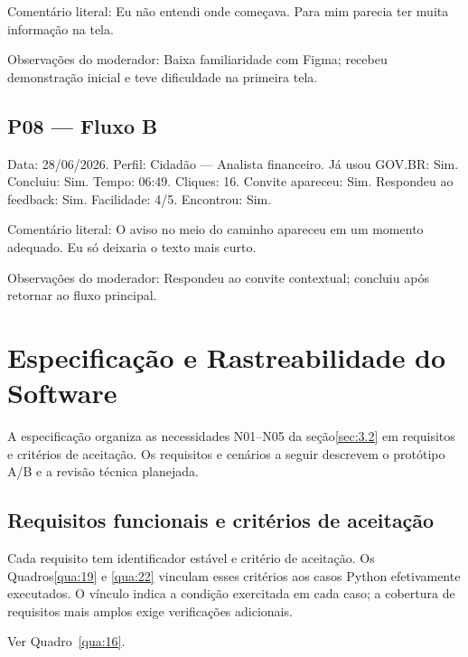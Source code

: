 \begin{apendicesenv}
Comentário literal: Eu não entendi onde começava. Para mim parecia ter muita informação na tela.

Observações do moderador: Baixa familiaridade com Figma; recebeu demonstração inicial e teve dificuldade na primeira tela.

\section{P08 --- Fluxo B}
\label{sec:G.8}

Data: 28/06/2026. Perfil: Cidadão --- Analista financeiro. Já usou GOV.BR: Sim. Concluiu: Sim. Tempo: 06:49. Cliques: 16. Convite apareceu: Sim. Respondeu ao feedback: Sim. Facilidade: 4/5. Encontrou: Sim.

Comentário literal: O aviso no meio do caminho apareceu em um momento adequado. Eu só deixaria o texto mais curto.

Observações do moderador: Respondeu ao convite contextual; concluiu após retornar ao fluxo principal.

\chapter{Especificação e Rastreabilidade do Software}
\label{ap:H}

A especificação organiza as necessidades N01--N05 da seção\nobreakspace{}\ref{sec:3.2} em requisitos e critérios de aceitação. Os requisitos e cenários a seguir descrevem o protótipo A/B e a revisão técnica planejada.

\section{Requisitos funcionais e critérios de aceitação}
\label{sec:H.1}

Cada requisito tem identificador estável e critério de aceitação. Os Quadros\nobreakspace{}\ref{qua:19} e \ref{qua:22} vinculam esses critérios aos casos Python efetivamente executados. O vínculo indica a condição exercitada em cada caso; a cobertura de requisitos mais amplos exige verificações adicionais.

\noindent Ver Quadro~\ref{qua:16}.


\end{apendicesenv}
